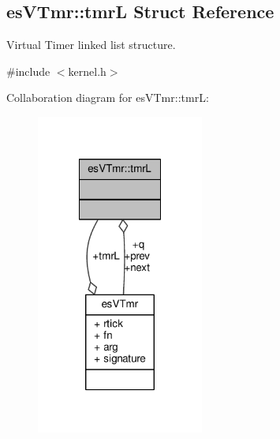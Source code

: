 \hypertarget{structesVTmr_1_1tmrL}{\subsection{es\-V\-Tmr\-:\-:tmr\-L Struct Reference}
\label{structesVTmr_1_1tmrL}
}


Virtual Timer linked list structure.  




{\ttfamily \#include $<$kernel.\-h$>$}



Collaboration diagram for es\-V\-Tmr\-:\-:tmr\-L\-:\nopagebreak
\begin{figure}[H]
\begin{center}
\leavevmode
\includegraphics[width=156pt]{structesVTmr_1_1tmrL__coll__graph}
\end{center}
\end{figure}
